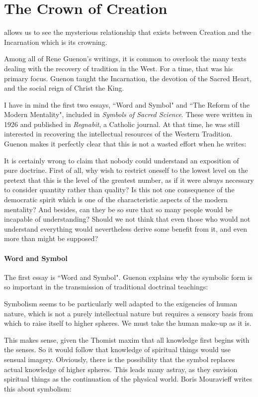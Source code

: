 \section{The Crown of Creation}

\begin{quotex}
[This] allows us to see the mysterious relationship that exists between Creation and the Incarnation which is its crowning. 

\end{quotex}
Among all of Rene Guenon's writings, it is common to overlook the many texts dealing with the recovery of tradition in the West. For a time, that was his primary focus. Guenon taught the Incarnation, the devotion of the Sacred Heart, and the social reign of Christ the King.

I have in mind the first two essays, ``Word and Symbol" and ``The Reform of the Modern Mentality", included in \emph{Symbols of Sacred Science}. These were written in 1926 and published in \emph{Regnabit}, a Catholic journal. At that time, he was still interested in recovering the intellectual resources of the Western Tradition. Guenon makes it perfectly clear that this is not a wasted effort when he writes:

\begin{quotex}
It is certainly wrong to claim that nobody could understand an exposition of pure doctrine. First of all, why wish to restrict oneself to the lowest level on the pretext that this is the level of the greatest number, as if it were always necessary to consider quantity rather than quality? Is this not one consequence of the democratic spirit which is one of the characteristic aspects of the modern mentality? And besides, can they be so sure that so many people would be incapable of understanding? Should we not think that even those who would not understand everything would nevertheless derive some benefit from it, and even more than might be supposed? 

\end{quotex}
\paragraph{Word and Symbol}
The first essay is ``Word and Symbol". Guenon explains why the symbolic form is so important in the transmission of traditional doctrinal teachings:

\begin{quotex}
Symbolism seems to be particularly well adapted to the exigencies of human nature, which is not a purely intellectual nature but requires a sensory basis from which to raise itself to higher spheres. We must take the human make-up as it is. 

\end{quotex}
This makes sense, given the Thomist maxim that all knowledge first begins with the senses. So it would follow that knowledge of spiritual things would use sensual imagery. Obviously, there is the possibility that the symbol replaces actual knowledge of higher spheres. This leads many astray, as they envision spiritual things as the continuation of the physical world. Boris Mouravieff writes this about symbolism:

